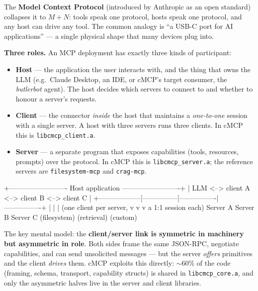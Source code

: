 \documentclass[10pt]{article}
\newcommand{\code}[1]{\texttt{\small #1}}
\begin{document}
The \textbf{Model Context Protocol} (introduced by Anthropic as an open standard)
collapses it to $M+N$: tools speak one protocol, hosts speak one protocol, and
any host can drive any tool. The common analogy is ``a USB-C port for AI
applications'' --- a single physical shape that many devices plug into.

\textbf{Three roles.} An MCP deployment has exactly three kinds of participant:

\begin{itemize}
  \item \textbf{Host} --- the application the user interacts with, and the thing
    that owns the LLM (e.g.\ Claude Desktop, an IDE, or cMCP's target consumer,
    the \emph{butlerbot} agent). The host decides which servers to connect to and
    whether to honour a server's requests.
  \item \textbf{Client} --- the connector \emph{inside} the host that maintains a
    \emph{one-to-one} session with a single server. A host with three servers
    runs three clients. In cMCP this is \code{libcmcp\_client.a}.
  \item \textbf{Server} --- a separate program that exposes capabilities (tools,
    resources, prompts) over the protocol. In cMCP this is
    \code{libcmcp\_server.a}; the reference servers are \code{filesystem-mcp} and
    \code{crag-mcp}.
\end{itemize}

\begin{diag}
   +------------------------- Host application -------------------------+
   |   LLM   <-->   client A   <-->   client B   <-->   client C        |
   +------------------|---------------|----------------|----------------+
                      |               |                |  (one client per server,
                      v               v                v   a 1:1 session each)
                  Server A        Server B         Server C
                (filesystem)     (retrieval)       (custom)
\end{diag}

The key mental model: the \textbf{client/server link is symmetric in machinery
but asymmetric in role}. Both sides frame the same JSON-RPC, negotiate
capabilities, and can send unsolicited messages --- but the server \emph{offers}
primitives and the client \emph{drives} them. cMCP exploits this directly: $\sim$60\%
of the code (framing, schema, transport, capability structs) is shared in
\code{libcmcp\_core.a}, and only the asymmetric halves live in the server and
client libraries.
\end{document}
